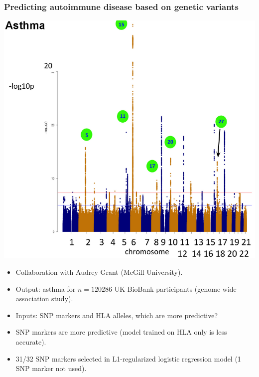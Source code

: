 \documentclass{beamer}
\begin{document}
\begin{frame}
  \frametitle{Predicting autoimmune disease based on genetic variants}
  \includegraphics[height=0.4\textheight]{Screenshot-asthma-pvalues}
  \begin{itemize}
  \item Collaboration with Audrey Grant (McGill University).
  \item Output: asthma for $n=120286$ UK BioBank participants (genome
    wide association study).
  \item Inputs: SNP markers and HLA alleles, which are more
    predictive?
  \item<2> SNP markers are more predictive (model trained on HLA only
    is less accurate).
  \item<2> 31/32 SNP markers selected in L1-regularized logistic
    regression model (1 SNP marker not used).
  \end{itemize}
\end{frame}
\end{document}
